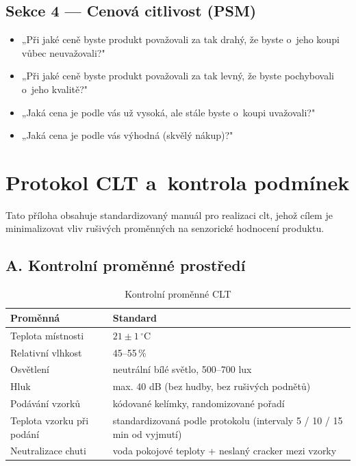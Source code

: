 \section*{Sekce 4 — Cenová citlivost (PSM)}
\begin{itemize}
  \item „Při jaké ceně byste produkt považovali za tak drahý, že byste o~jeho koupi vůbec neuvažovali?"
  \item „Při jaké ceně byste produkt považovali za tak levný, že byste pochybovali o~jeho kvalitě?"
  \item „Jaká cena je podle vás už vysoká, ale stále byste o~koupi uvažovali?"
  \item „Jaká cena je podle vás výhodná (skvělý nákup)?"
\end{itemize}

\chapter{Protokol CLT a~kontrola podmínek}
\label{app:clt_protocol}

Tato příloha obsahuje standardizovaný manuál pro realizaci \gls{clt}, jehož cílem je minimalizovat vliv rušivých proměnných na senzorické hodnocení produktu.

\section*{A. Kontrolní proměnné prostředí}
\begin{table}[H]
\centering
\caption{Kontrolní proměnné CLT}
\label{tab:clt_controls}
\begin{tabularx}{\textwidth}{lX}
\toprule
\textbf{Proměnná} & \textbf{Standard} \\
\midrule
Teplota místnosti & $21 \pm 1\,^{\circ}\mathrm{C}$ \\
Relativní vlhkost & 45--55\,\% \\
Osvětlení & neutrální bílé světlo, 500--700 lux \\
Hluk & max. 40 dB (bez hudby, bez rušivých podnětů) \\
Podávání vzorků & kódované kelímky, randomizované pořadí \\
Teplota vzorku při podání & standardizovaná podle protokolu (intervaly 5 / 10 / 15 min od vyjmutí) \\
Neutralizace chuti & voda pokojové teploty + neslaný cracker mezi vzorky \\
\bottomrule
\end{tabularx}
\end{table}

